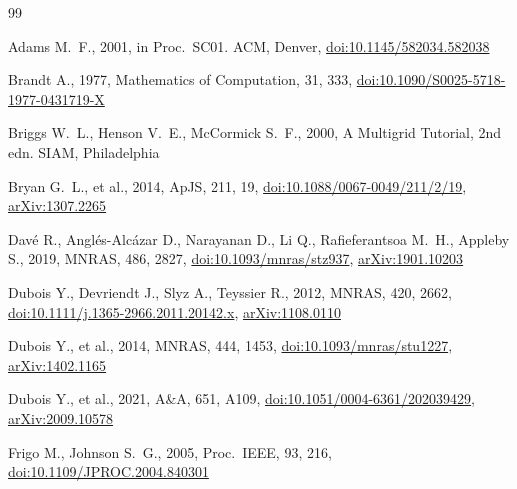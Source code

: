\documentclass[fleqn,usenatbib]{mnras}
\begin{document}
\begin{thebibliography}{99}

Adams M.~F., 2001, in Proc.\ SC01. ACM, Denver,
\href{https://doi.org/10.1145/582034.582038}{doi:10.1145/582034.582038}

Brandt A., 1977, Mathematics of Computation, 31, 333,
\href{https://doi.org/10.1090/S0025-5718-1977-0431719-X}{doi:10.1090/S0025-5718-1977-0431719-X}

Briggs W.~L., Henson V.~E., McCormick S.~F., 2000, A Multigrid Tutorial, 2nd edn. SIAM, Philadelphia

Bryan G.~L., et al., 2014, ApJS, 211, 19,
\href{https://doi.org/10.1088/0067-0049/211/2/19}{doi:10.1088/0067-0049/211/2/19},
\href{https://arxiv.org/abs/1307.2265}{arXiv:1307.2265}

Dav{\'e} R., Angl{\'e}s-Alc{\'a}zar D., Narayanan D., Li Q., Rafieferantsoa M.~H., Appleby S., 2019, MNRAS, 486, 2827,
\href{https://doi.org/10.1093/mnras/stz937}{doi:10.1093/mnras/stz937},
\href{https://arxiv.org/abs/1901.10203}{arXiv:1901.10203}

Dubois Y., Devriendt J., Slyz A., Teyssier R., 2012, MNRAS, 420, 2662,
\href{https://doi.org/10.1111/j.1365-2966.2011.20142.x}{doi:10.1111/j.1365-2966.2011.20142.x},
\href{https://arxiv.org/abs/1108.0110}{arXiv:1108.0110}

Dubois Y., et al., 2014, MNRAS, 444, 1453,
\href{https://doi.org/10.1093/mnras/stu1227}{doi:10.1093/mnras/stu1227},
\href{https://arxiv.org/abs/1402.1165}{arXiv:1402.1165}

Dubois Y., et al., 2021, A\&A, 651, A109,
\href{https://doi.org/10.1051/0004-6361/202039429}{doi:10.1051/0004-6361/202039429},
\href{https://arxiv.org/abs/2009.10578}{arXiv:2009.10578}

Frigo M., Johnson S.~G., 2005, Proc.\ IEEE, 93, 216,
\href{https://doi.org/10.1109/JPROC.2004.840301}{doi:10.1109/JPROC.2004.840301}


\end{thebibliography}
\end{document}
